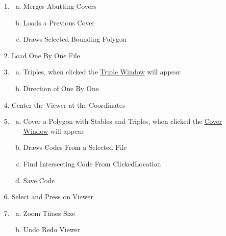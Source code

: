 \documentclass[11pt]{report}
\begin{document}
\begin{enumerate}
\begin{enumerate}[a.]
  \end{enumerate}
  \item 
  \begin{enumerate}[a.]
    \item Merges Abutting Covers
    \item Loads a Previous Cover
    \item Draws Selected Bounding Polygon
  \end{enumerate}
  \item  Load One By One File
  \item 
  \begin{enumerate}[a.]
    \item Triples, when clicked the \hyperref[triwin]{Triple Window} will appear
    \item Direction of One By One
  \end{enumerate}
  \item  Center the Viewer at the Coordinates
  \item 
  \begin{enumerate}[a.]
    \item Cover a Polygon with Stables and Triples, when clicked the \hyperref[covwin]{Cover Window} will appear
    \item Draws Codes From a Selected File
    \item Find Intersecting Code From ClickedLocation
    \item Save Code
  \end{enumerate}
  \item Select and Press on Viewer
  \item 
  \begin{enumerate}[a.]
    \item Zoom Times Size
    \item Undo Redo Viewer
  \end{enumerate}
\end{enumerate}
\end{document}

